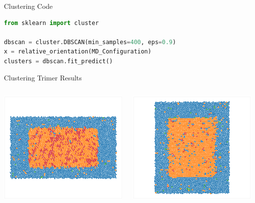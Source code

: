 \documentclass[aspectratio=169, 14pt]{beamer}
\begin{document}
\begin{frame}[fragile]{Clustering Code}

  \begin{lstlisting}[language=Python]
from sklearn import cluster

dbscan = cluster.DBSCAN(min_samples=400, eps=0.9)
x = relative_orientation(MD_Configuration)
clusters = dbscan.fit_predict()
  \end{lstlisting}

\end{frame}


\begin{frame}{Clustering Trimer Results}
  \begin{columns}
    \begin{column}{0.33\textwidth}
      \includegraphics[width=\textwidth]{clustering_results_p2.png}
    \end{column}
    \begin{column}{0.33\textwidth}
      \includegraphics[width=\textwidth]{clustering_results_p2gg.png}

\end{column}
\end{columns}
\end{frame}
\end{document}
